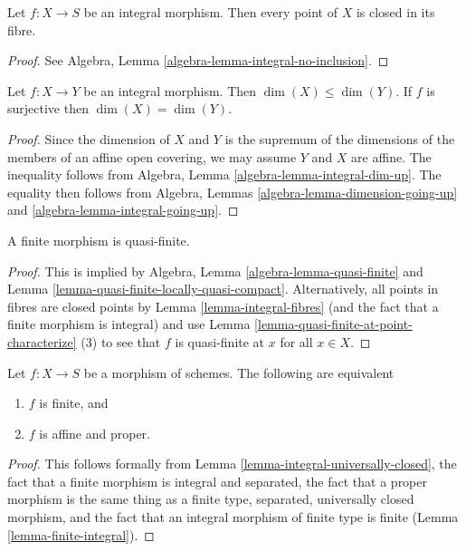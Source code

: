 \begin{lemma}
\label{lemma-integral-fibres}
Let $f : X \to S$ be an integral morphism.
Then every point of $X$ is closed in its fibre.
\end{lemma}

\begin{proof}
See Algebra, Lemma \ref{algebra-lemma-integral-no-inclusion}.
\end{proof}

\begin{lemma}
\label{lemma-integral-dimension}
Let $f : X \to Y$ be an integral morphism. Then $\dim(X) \leq \dim(Y)$.
If $f$ is surjective then $\dim(X) = \dim(Y)$.
\end{lemma}

\begin{proof}
Since the dimension of $X$ and $Y$ is the supremum of the dimensions
of the members of an affine open covering, we may assume $Y$ and $X$
are affine. The inequality follows from
Algebra, Lemma \ref{algebra-lemma-integral-dim-up}.
The equality then follows from
Algebra, Lemmas \ref{algebra-lemma-dimension-going-up}
and \ref{algebra-lemma-integral-going-up}.
\end{proof}

\begin{lemma}
\label{lemma-finite-quasi-finite}
A finite morphism is quasi-finite.
\end{lemma}

\begin{proof}
This is implied by Algebra, Lemma \ref{algebra-lemma-quasi-finite}
and Lemma \ref{lemma-quasi-finite-locally-quasi-compact}.
Alternatively, all points in fibres are closed points by
Lemma \ref{lemma-integral-fibres} (and the fact that a finite
morphism is integral) and use
Lemma \ref{lemma-quasi-finite-at-point-characterize} (3) to
see that $f$ is quasi-finite at $x$ for all $x \in X$.
\end{proof}

\begin{lemma}
\label{lemma-finite-proper}
Let $f : X \to S$ be a morphism of schemes. The following are equivalent
\begin{enumerate}
\item $f$ is finite, and
\item $f$ is affine and proper.
\end{enumerate}
\end{lemma}

\begin{proof}
This follows formally from
Lemma \ref{lemma-integral-universally-closed},
the fact that a finite morphism is integral and separated,
the fact that a proper morphism is the same thing as
a finite type, separated, universally closed morphism,
and the fact that an integral morphism of finite type is
finite (Lemma \ref{lemma-finite-integral}).
\end{proof}


